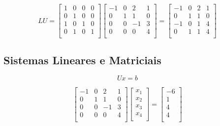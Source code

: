 \documentclass[a4paper]{article}
\begin{document}
\begin{displaymath}
  LU = \begin{bmatrix}
    1&0&0&0\\
    0&1&0&0\\
    1&0&1&0\\
    0&1&0&1\\
  \end{bmatrix} \begin{bmatrix}
    -1&0&2&1\\
    0&1&1&0\\
    0&0&-1&3\\
    0&0&0&4\\
  \end{bmatrix}
  =
  \begin{bmatrix}
    -1&0&2&1\\
    0&1&1&0\\
    -1&0&1&4\\
    0&1&1&4\\
  \end{bmatrix}
\end{displaymath}

\subsection*{Sistemas Lineares e Matriciais}

\begin{displaymath}
  Ux=b
\end{displaymath}

\begin{displaymath}
  \begin{bmatrix}
    -1&0&2&1\\
    0&1&1&0\\
    0&0&-1&3\\
    0&0&0&4\\
  \end{bmatrix}
  \begin{bmatrix}
    x_1\\
    x_2\\
    x_3\\
    x_4\\
  \end{bmatrix}
  =
  \begin{bmatrix}
    -6\\
    1\\
    4\\
    4\\
  \end{bmatrix}
\end{displaymath}
\end{document}
